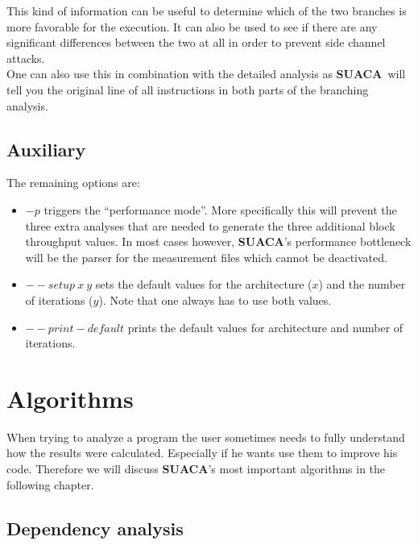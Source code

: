 \documentclass[a4paper,12pt,titlepage, twoside]{report}
\newcommand{\suaca}{\textbf{SUACA}}
\begin{document}
This kind of information can be useful to determine which of the two branches is more favorable for the execution. It can also be used to see if there are any significant differences between the two at all in order to prevent side channel attacks.\\
One can also use this in combination with the detailed analysis as \suaca\ will tell you the original line of all instructions in both parts of the branching analysis.

\section{Auxiliary}
The remaining options are:

\begin{itemize}
    \item $-p$ triggers the ``performance mode''. More specifically this will prevent the three extra analyses that are needed to generate the three additional block throughput values. In most cases however, \suaca's performance bottleneck will be the parser for the measurement files which cannot be deactivated. 
    \item ${--}setup\ x\ y$ sets the default values for the architecture ($x$) and the number of iterations ($y$). Note that one always has to use both values. 
    \item ${--}print-default$ prints the default values for architecture and number of iterations.
\end{itemize}










\chapter{Algorithms}
\label{chap:algorithms}

When trying to analyze a program the user sometimes needs to fully understand how the results were calculated. Especially if he wants use them to improve his code. Therefore we will discuss \suaca's most important algorithms in the following chapter.

\section{Dependency analysis}
\label{sec:depanalysis}
\end{document}
